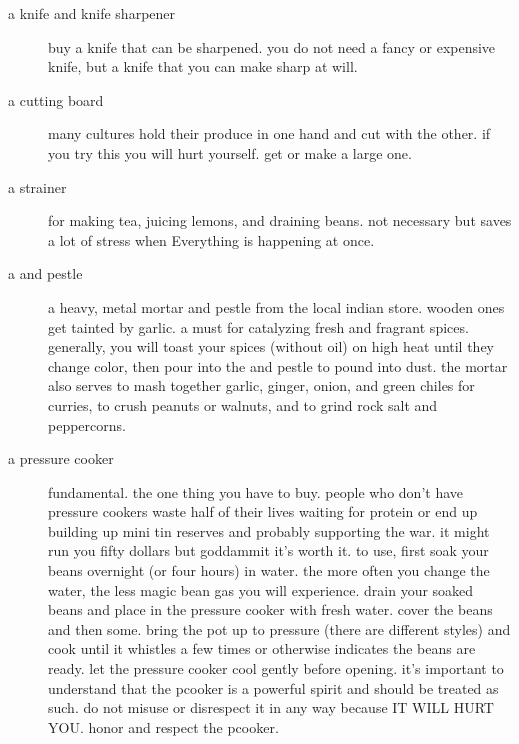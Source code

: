 \begin{description}

  \item[a knife and knife sharpener] buy a knife that can be
  sharpened. you do not need a fancy or expensive knife, but a knife
  that you can make sharp at will.

  \item[a cutting board] many cultures hold their produce in one hand
  and cut with the other. if you try this you will hurt yourself. get
  or make a large one.

  \item[a strainer] for making tea, juicing lemons, and draining
  beans. not necessary but saves a lot of stress when Everything is
  happening at once.

  \item[a  and pestle] a heavy, metal mortar and pestle from the
  local indian store. wooden ones get tainted by garlic. a must for
  catalyzing fresh and fragrant spices. generally, you will toast your
  spices (without oil) on high heat until they change color, then pour
  into the  and pestle to pound into dust. the mortar also
  serves to mash together garlic, ginger, onion, and green chiles for
  curries, to crush peanuts or walnuts, and to grind rock salt and
  peppercorns.

  \item[a pressure cooker] fundamental. the one thing you have to
  buy. people who don't have pressure cookers waste half of their
  lives waiting for protein or end up building up mini tin reserves
  and probably supporting the war. it might run you fifty dollars but
  goddammit it's worth it. to use, first soak your beans overnight (or
  four hours) in water. the more often you change the water, the less
  magic bean gas you will experience. drain your soaked beans and
  place in the pressure cooker with fresh water. cover the beans and
  then some. bring the pot up to pressure (there are different styles)
  and cook until it whistles a few times or otherwise indicates the
  beans are ready. let the pressure cooker cool gently before
  opening. it's important to understand that the pcooker is a powerful
  spirit and should be treated as such. do not misuse or disrespect it
  in any way because IT WILL HURT YOU. honor and respect the pcooker.


\end{description}
